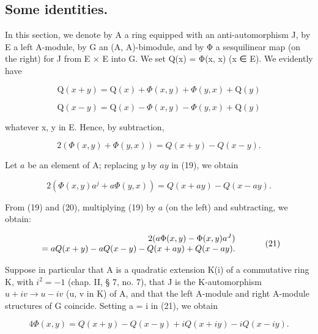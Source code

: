 \subsection{Some identities.}

In this section, we denote by A a ring equipped with an anti-automorphism J, by E a left A-module, by G an (A, A)-bimodule, and by Φ a sesquilinear map (on the right) for J from E × E into G. We set Q(x) = Φ(x, x) (x ∈ E). We evidently have

\[
\mathrm{Q} (x + y) = \mathrm{Q} (x) + \Phi (x, y) + \Phi (y, x) + \mathrm{Q} (y)\tag{17}
\]

\[
\mathrm{Q} (x - y) = \mathrm{Q} (x) - \Phi (x, y) - \Phi (y, x) + \mathrm{Q} (y)\tag{18}
\]

whatever x, y in E. Hence, by subtraction,

\[
2 (\Phi (x, y) + \Phi (y, x)) = Q (x + y) - Q (x - y).\tag{19}
\]

Let \(a\) be an element of A; replacing \(y\) by \(ay\) in (19), we obtain

\[
2 (\Phi (x, y) a ^ {j} + a \Phi (y, x)) = Q (x + a y) - Q (x - a y).\tag{20}
\]

From (19) and (20), multiplying (19) by \(a\) (on the left) and subtracting, we obtain:

\[
\begin{array}{r l} 2 (a \Phi (x, y) - \Phi (x, y) a ^ {J}) & \\ = a Q (x + y) - a Q (x - y) - Q (x + a y) + Q (x - a y). \end{array}\tag{21}
\]

Suppose in particular that A is a quadratic extension K(i) of a commutative ring K, with \(i^{2} = -1\) (chap. II, § 7, no. 7), that J is the K-automorphism \(u + iv \rightarrow u - iv\) (u, v in K) of A, and that the left A-module and right A-module structures of G coincide. Setting a = i in (21), we obtain

\[
4 \Phi (x, y) = Q (x + y) - Q (x - y) + i Q (x + i y) - i Q (x - i y). \tag {22}
\]

